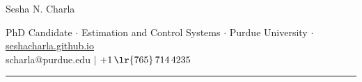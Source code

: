 \documentclass[letterpaper, 10pt]{article}
\begin{document}
\begin{center}
        \huge
        Sesha N. Charla
\end{center}
\begin{center}
        PhD Candidate $\cdot$
        Estimation and Control Systems $\cdot$
        Purdue University $\cdot$
        \href{https://seshacharla.github.io}{seshacharla.github.io}\\
        scharla@purdue.edu $|$
        $+1\,\lr{765}\, 714 \, 4235$
\end{center}

\noindent\rule{\textwidth}{0.4pt}


% 




\end{document}
